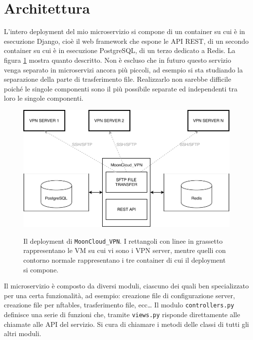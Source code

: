 \section{Architettura}
L'intero deployment del mio microservizio si compone di un container
su cui è in esecuzione Django, cioè il web framework che espone le API REST,
di un secondo container su cui è in esecuzione PostgreSQL, di un terzo dedicato
a Redis.
La figura \ref{fig:microservice-deployment} mostra quanto descritto.
Non è escluso che in futuro questo servizio venga separato in microservizi
ancora più piccoli, ad esempio si sta studiando la separazione della
parte di trasferimento file. Realizzarlo non sarebbe
difficile poiché le singole componenti sono il più possibile separate ed independenti
tra loro le singole componenti.

\begin{figure}
  \includegraphics[scale=0.5]{img/microservice_deployment}
  \label{fig:microservice-deployment}
  \caption[Il deployment di \texttt{MoonCloud\_VPN}]{
    Il deployment di \texttt{MoonCloud\_VPN}. I rettangoli con linee in grassetto
    rappresentano le VM su cui vi sono i VPN server, mentre quelli con contorno
    normale rappresentano i tre container di cui il deployment si compone.
  }
\end{figure}


Il microservizio è composto da diversi moduli, ciascuno dei quali ben
specializzato per una certa funzionalità, ad esempio: creazione file di configurazione
server, creazione file per nftables, trasferimento file, ecc\ldots
Il modulo \texttt{controllers.py}  definisce
una serie di funzioni che, tramite \texttt{views.py} risponde direttamente alle
chiamate alle API del servizio. Si cura di chiamare i metodi delle classi di tutti
gli altri moduli.

